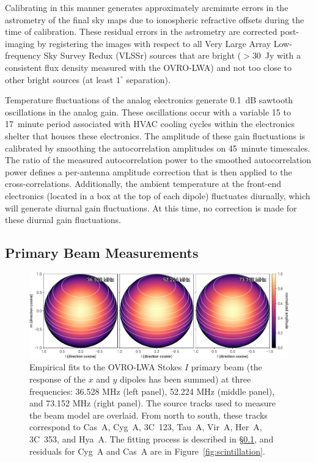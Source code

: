 \documentclass[twocolumn]{aastex61}
\begin{document}
Calibrating in this manner generates approximately arcminute errors in the astrometry of the final
sky maps due to ionospheric refractive offsets during the time of calibration.  These residual
errors in the astrometry are corrected post-imaging by registering the images with respect to all
Very Large Array Low-frequency Sky Survey Redux (VLSSr) \citep{2014MNRAS.440..327L} sources that are
bright ($>30$~Jy with a consistent flux density measured with the OVRO-LWA) and not too close to
other bright sources (at least $1^\circ$ separation).

Temperature fluctuations of the analog electronics generate 0.1~dB sawtooth oscillations in the
analog gain. These oscillations occur with a variable 15 to 17~minute period associated with HVAC
cooling cycles within the electronics shelter that houses these electronics.  The amplitude of these
gain fluctuations is calibrated by smoothing the autocorrelation amplitudes on 45~minute timescales.
The ratio of the measured autocorrelation power to the smoothed autocorrelation power defines a
per-antenna amplitude correction that is then applied to the cross-correlations.  Additionally, the
ambient temperature at the front-end electronics (located in a box at the top of each dipole)
fluctuates diurnally, which will generate diurnal gain fluctuations. At this time, no correction is
made for these diurnal gain fluctuations.

\subsection{Primary Beam Measurements}\label{sec:beam}

\begin{figure}[t]
    \includegraphics[width=\textwidth]{figures/beam/beam}
    \caption{
        Empirical fits to the OVRO-LWA Stokes $I$ primary beam (the response of the $x$ and
        $y$ dipoles has been summed) at three frequencies: 36.528 MHz (left panel), 52.224 MHz
        (middle panel), and 73.152 MHz (right panel). The source tracks used to measure the beam
        model are overlaid. From north to south, these tracks correspond to Cas~A, Cyg~A, 3C~123,
        Tau~A, Vir~A, Her~A, 3C~353, and Hya~A.  The fitting process is described in
        \S\ref{sec:beam}, and residuals for Cyg~A and Cas~A are in Figure~\ref{fig:scintillation}.
    }
    \label{fig:beam}
\end{figure}
\end{document}
